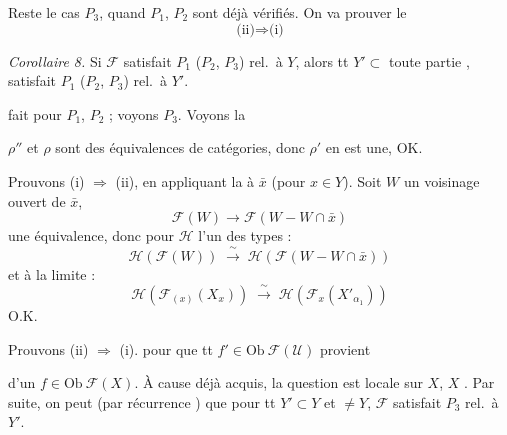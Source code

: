 \documentclass[11pt,a4paper]{article}
\begin{document}

Reste le cas $P_3$, \struck{\ill{}} quand $P_1$, $P_2$ sont déjà vérifiés.
\ill{} On va prouver le
\[
  \text{(ii)} \Longrightarrow \text{(i)}
\]

\emph{Corollaire 8.} Si $\mathcal{F}$ satisfait $P_1$ ($P_2$, $P_3$) rel.\ à
$Y$, alors  tt \ill{} $Y' \subset$
 \ill{} toute partie \ill{} ,
 satisfait $P_1$ ($P_2$, $P_3$) rel.\ à $Y'$.

 fait pour $P_1$, $P_2$ ; voyons $P_3$. Voyons la \ill{}
\struck{\ill{}}



\ill{} $\rho''$ et $\rho$ sont des équivalences de catégories, donc $\rho'$ en
est une, OK.

Prouvons (i) $\Longrightarrow$ (ii), en appliquant la  à
$\bar{x}$ (pour $x \in Y$). Soit $W$ un voisinage ouvert de $\bar{x}$, \ill{}
\[
  \mathcal{F}(W) \longrightarrow \mathcal{F}(W - W \cap \bar{x})
\]
une équivalence, donc  \ill{} pour $\mathcal{H}$ l'un
des types :
\[
  \mathcal{H}(\mathcal{F}(W)) \;\xrightarrow{\ \sim\ }\;
  \mathcal{H}(\mathcal{F}(W - W \cap \bar{x}))
\]
et \ill{} à la limite \ill{} :
\[
  \mathcal{H}(\mathcal{F}_{(x)}(X_{x})) \;\xrightarrow{\ \sim\ }\;
  \mathcal{H}(\mathcal{F}_{x}(X'_{\alpha_1}))
\]
O.K.


Prouvons (ii) $\Longrightarrow$ (i). \ill{} pour \ill{} que tt
$f' \in \mathrm{Ob}\ \mathcal{F}(\mathcal{U})$ provient

d'un $f \in \mathrm{Ob}\ \mathcal{F}(X)$. À cause \ill{} déjà acquis, la
question est locale sur $X$, \ill{} $X$ . Par suite, on
peut \ill{} (par récurrence ) que pour tt
$Y' \subset Y$ et $\ne Y$, \struck{\ill{}} $\mathcal{F}$ satisfait $P_3$
rel.\ à $Y'$.
\end{document}
